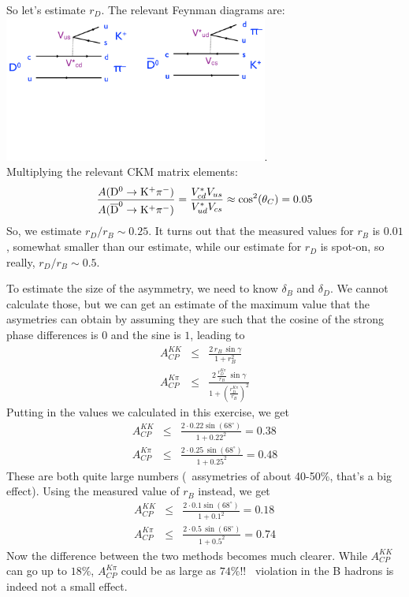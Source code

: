 \begin{enumerate}[a)]
{ So let's estimate $r_D$. The relevant Feynman diagrams are:
 \\\includegraphics[width=0.65\textwidth]{problemsheets/ps2figs/D2KpiDiagrams}.\\
 Multiplying the relevant CKM matrix elements:
    \[
     \frac{A({\rm {\rm D^{0}} \to K^+ \pi^-})}{A({\rm {\rm \overline{D}^0}\to K^+\pi^-})}
     =
     \frac{V_{cd}^* V_{us}}{ V_{ud}^* V_{cs}}
     \approx \cos^2(\theta_C) = 0.05
    \]
 So, we estimate $r_D/r_B \sim 0.25$. It turns out that the measured values for $r_B$ is $0.01$, somewhat smaller than our estimate, while our estimate for $r_D$ is spot-on, so really, $r_D/r_B \sim 0.5$.
 
 To estimate the size of the asymmetry, we need to know $\delta_B$ and $\delta_D$. We cannot calculate those, but we can get an estimate of the maximum value that the asymetries can obtain by assuming they are such that the cosine of the strong phase differences is $0$ and the sine is $1$, leading to
 \begin{eqnarray*}
     A_{CP}^{KK} 
       & \leq & 
      \frac{
        2\,r_B\,\sin\gamma
      }{
        1 + r_B^2 
      }
  \\ A_{CP}^{K\pi} 
       & \leq & 
      \frac{
        2\,\frac{r_D^{K\pi}}{r_B}\,\sin\gamma
      }{
        1 + \left(\frac{r_D^{K\pi}}{r_B}\right)^2 
      } 
  \end{eqnarray*}
 Putting in the values we calculated in this exercise, we get
  \begin{eqnarray*}
     A_{CP}^{KK} 
       & \leq & 
      \frac{
        2 \cdot 0.22 \sin(68^{\circ})
      }{
        1 + 0.22^2 
      } = 0.38
  \\ A_{CP}^{K\pi} 
       & \leq & 
      \frac{
        2\cdot 0.25\,\sin(68^{\circ})
      }{
        1 + 0.25^2 
      } =0.48
  \end{eqnarray*}
 These are both quite large numbers (\cp\ assymetries of about 40-50\%, that's a big effect). Using the measured value of $r_B$ instead, we get
  \begin{eqnarray*}
     A_{CP}^{KK} 
       & \leq & 
      \frac{
        2 \cdot 0.1 \sin(68^{\circ})
      }{
        1 + 0.1^2 
      } = 0.18
  \\ A_{CP}^{K\pi} 
       & \leq & 
      \frac{
        2\cdot 0.5\,\sin(68^{\circ})
      }{
        1 + 0.5^2 
      } =0.74
  \end{eqnarray*}
 Now the difference between the two methods becomes much clearer. While $A_{CP}^{KK}$ can go up to $18\%$, $A_{CP}^{K\pi}$ could be as large as $74\%$!! \cp\ violation in the B hadrons is indeed not a small effect.
 }
\end{enumerate}

